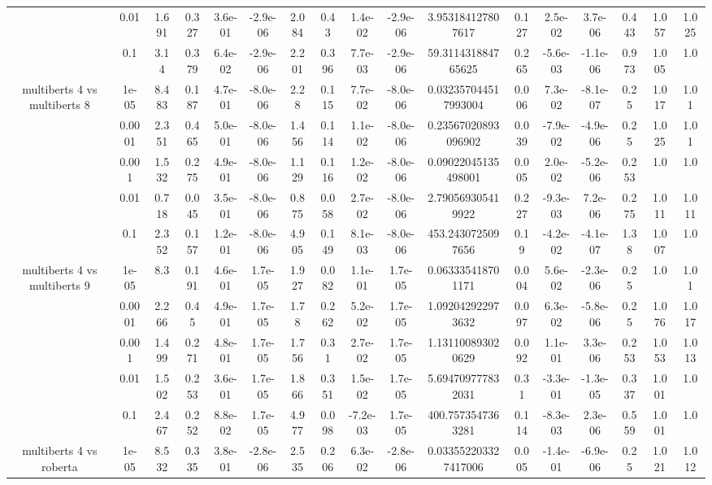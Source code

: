 \begin{tabular}{|c|c|c|c|c|c|c|c|c|c|c|c|c|c|c|c|c|}
 & 0.01 & 1.691 & 0.327 & 3.6e-01 & -2.9e-06 & 2.084 & 0.43 & 1.4e-02 & -2.9e-06 & 3.953184127807617 & 0.127 & 2.5e-02 & 3.7e-06 & 0.443 & 1.057 & 1.025 \\
 & 0.1 & 3.14 & 0.379 & 6.4e-02 & -2.9e-06 & 2.201 & 0.396 & 7.7e-03 & -2.9e-06 & 59.311431884765625 & 0.265 & -5.6e-03 & -1.1e-06 & 0.973 & 1.005 & 1.0 \\
\hline
\multirow{5}{*}{multiberts 4 vs multiberts 8} & 1e-05 & 8.483 & 0.187 & 4.7e-01 & -8.0e-06 & 2.28 & 0.115 & 7.7e-02 & -8.0e-06 & 0.032357044517993004 & 0.006 & 7.3e-02 & -8.1e-07 & 0.25 & 1.017 & 1.01 \\
 & 0.0001 & 2.351 & 0.465 & 5.0e-01 & -8.0e-06 & 1.456 & 0.114 & 1.1e-02 & -8.0e-06 & 0.23567020893096902 & 0.039 & -7.9e-02 & -4.9e-06 & 0.25 & 1.025 & 1.01 \\
 & 0.001 & 1.532 & 0.275 & 4.9e-01 & -8.0e-06 & 1.129 & 0.116 & 1.2e-02 & -8.0e-06 & 0.09022045135498001 & 0.005 & 2.0e-02 & -5.2e-06 & 0.253 & 1.0 & 1.0 \\
 & 0.01 & 0.718 & 0.045 & 3.5e-01 & -8.0e-06 & 0.875 & 0.058 & 2.7e-02 & -8.0e-06 & 2.790569305419922 & 0.227 & -9.3e-03 & 7.2e-06 & 0.275 & 1.011 & 1.011 \\
 & 0.1 & 2.352 & 0.157 & 1.2e-01 & -8.0e-06 & 4.905 & 0.149 & 8.1e-03 & -8.0e-06 & 453.2430725097656 & 0.19 & -4.2e-02 & -4.1e-07 & 1.38 & 1.007 & 1.0 \\
\hline
\multirow{5}{*}{multiberts 4 vs multiberts 9} & 1e-05 & 8.3 & 0.191 & 4.6e-01 & 1.7e-05 & 1.927 & 0.082 & 1.1e-01 & 1.7e-05 & 0.063335418701171 & 0.004 & 5.6e-02 & -2.3e-06 & 0.25 & 1.0 & 1.01 \\
 & 0.0001 & 2.266 & 0.45 & 4.9e-01 & 1.7e-05 & 1.78 & 0.262 & 5.2e-02 & 1.7e-05 & 1.092042922973632 & 0.097 & 6.3e-02 & -5.8e-06 & 0.25 & 1.076 & 1.017 \\
 & 0.001 & 1.499 & 0.271 & 4.8e-01 & 1.7e-05 & 1.756 & 0.31 & 2.7e-02 & 1.7e-05 & 1.131100893020629 & 0.092 & 1.1e-01 & 3.3e-06 & 0.253 & 1.053 & 1.013 \\
 & 0.01 & 1.502 & 0.253 & 3.6e-01 & 1.7e-05 & 1.866 & 0.351 & 1.5e-02 & 1.7e-05 & 5.694709777832031 & 0.31 & -3.3e-01 & -1.3e-05 & 0.337 & 1.001 & 1.0 \\
 & 0.1 & 2.467 & 0.252 & 8.8e-02 & 1.7e-05 & 4.977 & 0.098 & -7.2e-03 & 1.7e-05 & 400.7573547363281 & 0.114 & -8.3e-03 & 2.3e-06 & 0.559 & 1.001 & 1.0 \\
\hline
\multirow{5}{*}{multiberts 4 vs roberta } & 1e-05 & 8.532 & 0.335 & 3.8e-01 & -2.8e-06 & 2.535 & 0.206 & 6.3e-02 & -2.8e-06 & 0.033552203327417006 & 0.005 & -1.4e-01 & -6.9e-06 & 0.25 & 1.021 & 1.012 \\

\end{tabular}
